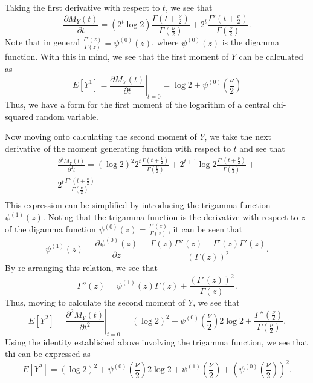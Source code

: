 Taking the first derivative with respect to $t$, we see that
\begin{equation}
	\frac{\partial M_Y(t)}{\partial t} = (2^t \log 2) \frac{\Gamma (t + \frac{\nu}{2})}{\Gamma (\frac{\nu}{2})} + 2^t \frac{\Gamma ' (t + \frac{\nu}{2})}{\Gamma (\frac{\nu}{2})} .
\end{equation}
Note that in general $\frac{\Gamma ' (z)}{\Gamma (z)} = \psi^{(0)}(z)$, where $\psi^{(0)}(z)$ is the digamma function. With this in mind, we see that the first moment of
$Y$ can be calculated as
\begin{equation}
	E \left[ Y^1 \right] =  \left. \frac{\partial M_Y(t)}{\partial t} \right|_{t=0} = \log 2 + \psi^{(0)} \left( \frac{\nu}{2} \right)
\end{equation}
Thus, we have a form for the first moment of the logarithm of a central chi-squared random variable.

Now moving onto calculating the second moment of $Y$, we take the next derivative of the moment generating function with respect to $t$ and see that
\begin{equation}
	\begin{split}
		\frac{\partial^2 M_Y(t)}{\partial^2 t} = (\log 2)^2 2^t  \frac{\Gamma (t + \frac{\nu}{2})}{\Gamma (\frac{\nu}{2})} + 2^{t+1} \log 2 \frac{\Gamma ' (t + \frac{\nu}{2})}{\Gamma (\frac{\nu}{2})} + \\ 
		2^t \frac{\Gamma '' (t + \frac{\nu}{2})}{\Gamma (\frac{\nu}{2})} \\
	\end{split}
\end{equation}
This expression can be simplified by introducing the trigamma function $ \psi^{(1)}(z)$. Noting that the trigamma function is the derivative with respect
to $z$ of the digamma function $\psi^{(0)}(z) = \frac{\Gamma ' (z)}{\Gamma (z)}$, it can be seen that
\begin{equation}
	\psi^{(1)}(z) = \frac{\partial \psi^{(0)}(z)}{\partial z} = \frac{\Gamma (z) \Gamma '' (z) - \Gamma '(z) \Gamma '(z)}{(\Gamma(z))^2} .
\end{equation}
By re-arranging this relation, we see that
\begin{equation}
	\Gamma ''(z) = \psi^{(1)}(z) \Gamma(z) + \frac{(\Gamma '(z))^2}{\Gamma(z)} .
\end{equation}
Thus, moving to calculate the second moment of $Y$, we see that
\begin{equation}
	E \left[ Y^2 \right] =  \left. \frac{\partial^2 M_Y(t)}{\partial t^2} \right|_{t=0} =
	(\log 2)^2 + \psi^{(0)} \left( \frac{\nu}{2} \right) 2 \log 2  + \frac{\Gamma '' (\frac{\nu}{2})}{\Gamma (\frac{\nu}{2})} .
\end{equation}
Using the identity established above involving the trigamma function, we see that thi can be expressed as
\begin{equation}
	E \left[ Y^2 \right] =
	(\log 2)^2 + \psi^{(0)} \left( \frac{\nu}{2} \right) 2 \log 2  + \psi^{(1)} \left( \frac{\nu}{2} \right) + \left( \psi^{(0)} \left( \frac{\nu}{2} \right) \right)^2 .
\end{equation}

